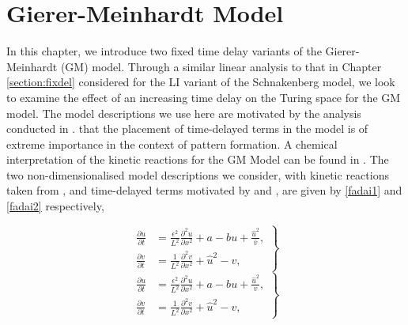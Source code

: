 \chapter{Gierer-Meinhardt Model}

In this chapter, we introduce two fixed time delay variants of the Gierer-Meinhardt (GM) model. Through a similar linear analysis to that in Chapter \ref{section:fixdel} considered for the LI variant of the Schnakenberg model, we look to examine the effect of an increasing time delay on the Turing space for the GM model. The model descriptions we use here are motivated by the analysis conducted in \cite{fadai1,fadai2}.  that the placement of time-delayed terms in the model is of extreme importance in the context of pattern formation. A chemical interpretation of the kinetic reactions for the GM Model can be found in \cite{leegaffmonk}. The two non-dimensionalised model descriptions we consider, with kinetic reactions taken from \cite{murray}, and time-delayed terms motivated by \cite{fadai1} and \cite{fadai2}, are given by \eqref{fadai1} and \eqref{fadai2} respectively, 
\begin{multicols}{2}
\begin{equation}\label{fadai1}
  \left.\begin{split}
\frac{\partial u}{\partial t}&=\frac{\epsilon^2}{L^2}\frac{\partial^2 u}{\partial x^2}+a-bu+\frac{\hat{u}^2}{\hat{v}},\\
\frac{\partial v}{\partial t}&=\frac{1}{L^2}\frac{\partial^2 v}{\partial x^2}+\hat{u}^2-v,
\end{split}\right\}
\end{equation}
\break
\begin{equation}\label{fadai2}
  \left.\begin{split}
\frac{\partial u}{\partial t}&=\frac{\epsilon^2}{L^2}\frac{\partial^2 u}{\partial x^2}+a-bu+\frac{\hat{u}^2}{v},\\
\frac{\partial v}{\partial t}&=\frac{1}{L^2}\frac{\partial^2 v}{\partial x^2}+\hat{u}^2-v,
\end{split}\right\}
\end{equation}
\end{multicols}
